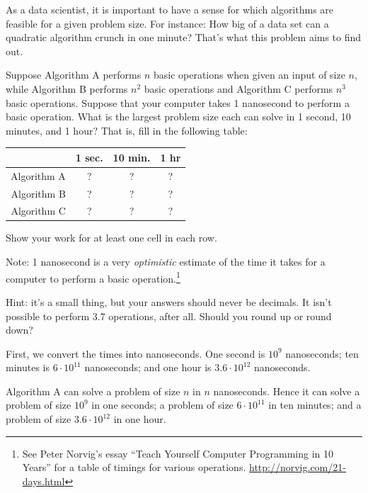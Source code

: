 \begin{prob}
    As a data scientist, it is important to have a sense for which algorithms
    are feasible for a given problem size. For instance: How big of a data set can a quadratic algorithm
    crunch in one minute? That's what this problem aims to find out.

    \newcommand{\algA}{Algorithm \textsf{A}}
    \newcommand{\algB}{Algorithm \textsf{B}}
    \newcommand{\algC}{Algorithm \textsf{C}}

    Suppose \algA{} performs $n$ basic operations when given an input of size $n$,
    while \algB{} performs $n^2$ basic operations and \algC{} performs $n^3$ basic
    operations. Suppose that your computer takes 1 nanosecond to perform a basic operation.
    What is the largest problem size each can solve in 1 second,
    10 minutes, and 1 hour? That is, fill in the following table:

    \begin{center}
    \begin{tabular}{rccc}
        \toprule
        & 1 sec. & 10 min. & 1 hr\\ \midrule
        \algA & ? & ? & ?\\
        \algB & ? & ? & ?\\
        \algC & ? & ? & ?\\\bottomrule
    \end{tabular}
    \end{center}

    Show your work for at least one cell in each row.

    Note: 1 nanosecond is a very \emph{optimistic} estimate of the time it takes for a computer
    to perform a basic operation.\footnote{See Peter Norvig's essay ``Teach Yourself Computer
    Programming in 10 Years'' for a table of timings for various operations. \url{http://norvig.com/21-days.html}}

    Hint: it's a small thing, but your answers should never be decimals. It isn't possible
    to perform 3.7 operations, after all. Should you round up or round down?

    \begin{soln}
        First, we convert the times into nanoseconds. One second is $10^9$ nanoseconds;
        ten minutes is $6 \cdot 10^{11}$ nanoseconds; and one hour is $3.6 \cdot
        10^{12}$ nanoseconds.

        \algA{} can solve a problem of size $n$ in $n$ nanoseconds. Hence
        it can solve a problem of size $10^9$ in one seconds;
        a problem of size $6 \cdot 10^{11}$ in ten minutes; and a problem
        of size $3.6 \cdot 10^{12}$ in one hour.


\end{soln}
\end{prob}
